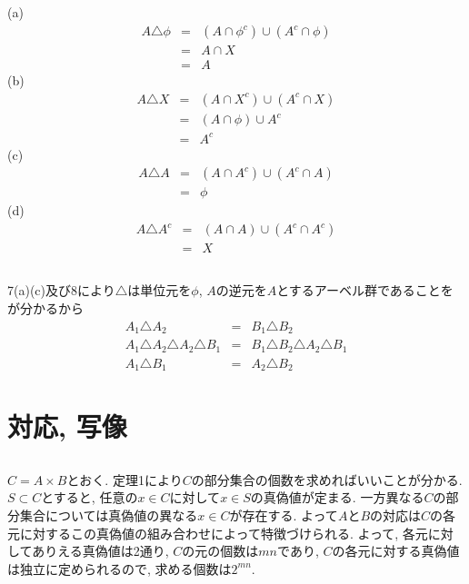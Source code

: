 \documentclass{jsarticle}
\begin{document}
\subsection{}	%
\noindent
(a)
\begin{eqnarray*}
	A \triangle \phi
	&=& (A \cap \phi^c) \cup (A^c \cap \phi)\\
	&=& A \cap X\\
	&=& A
\end{eqnarray*}
(b)
\begin{eqnarray*}
	A \triangle X
	&=& (A \cap X^c) \cup (A^c \cap X)\\
	&=& (A \cap \phi) \cup A^c\\
	&=& A^c
\end{eqnarray*}
(c)
\begin{eqnarray*}
	A \triangle A
	&=& (A \cap A^c) \cup (A^c \cap A)\\
	&=& \phi
\end{eqnarray*}
(d)
\begin{eqnarray*}
	A \triangle A^c
	&=& (A \cap A) \cup (A^c \cap A^c)\\
	&=& X
\end{eqnarray*}
\subsection{}	%
7(a)(c)及び8により$\triangle$は単位元を$\phi$, $A$の逆元を$A$とするアーベル群であることをが分かるから
\begin{eqnarray*}
	A_1 \triangle A_2 &=& B_1 \triangle B_2\\
	A_1 \triangle A_2 \triangle A_2 \triangle B_1 &=& B_1 \triangle B_2 \triangle A_2 \triangle B_1\\
	A_1 \triangle B_1 &=& A_2 \triangle B_2
\end{eqnarray*}

\section{対応, 写像}	%
\subsection{} %
$C = A \times B$とおく. 定理1により$C$の部分集合の個数を求めればいいことが分かる. $S \subset C$とすると, 任意の$x \in C$に対して$x \in S$の真偽値が定まる. 一方異なる$C$の部分集合については真偽値の異なる$x \in C$が存在する. よって$A$と$B$の対応は$C$の各元に対するこの真偽値の組み合わせによって特徴づけられる. よって, 各元に対してありえる真偽値は2通り, $C$の元の個数は$mn$であり, $C$の各元に対する真偽値は独立に定められるので, 求める個数は$2^{mn}$.
\end{document}
